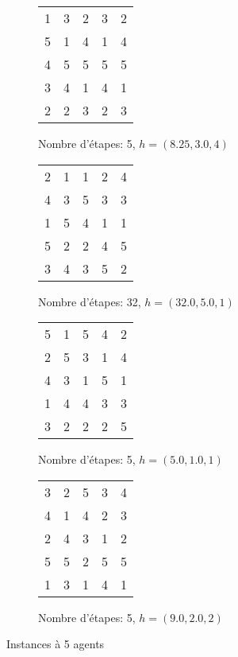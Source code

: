 \documentclass[a4paper, 10pt]{article}
\newcommand{\bb}[1]{\colorbox{blue!30}{#1}}
\begin{document}
\begin{figure}[h]
\centering
\begin{subfigure}[h]{0.45\textwidth}
	\centering
	\begin{tabular}{|c c c c c|}
		\hline
		\bb{1} & \bb{3} & \bb{2} & 3 & 2 \\
		5 & 1 & 4 & 1 & \bb{4} \\
		4 & 5 & 5 & \bb{5} & 5 \\
		3 & 4 & 1 & 4 & 1 \\
		2 & 2 & 3 & 2 & 3 \\
		\hline
	\end{tabular}
	\caption{Nombre d'étapes: 5, $h = (8.25, 3.0, 4)$}
\end{subfigure}
\begin{subfigure}[h]{0.45\textwidth}
	\centering
	\begin{tabular}{|c c c c c|}
		\hline
		2 & 1 & 1 & \bb{2} & 4 \\
		\bb{4} & \bb{3} & \bb{5} & 3 & 3 \\
		1 & 5 & 4 & 1 & \bb{1} \\
		5 & 2 & 2 & 4 & 5 \\
		3 & 4 & 3 & 5 & 2 \\
		\hline
	\end{tabular}
	\caption{Nombre d'étapes: 32, $h = (32.0, 5.0, 1)$}
\end{subfigure}
\begin{subfigure}[h]{0.45\textwidth}
	\centering
	\begin{tabular}{|c c c c c|}
		\hline
		\bb{5} & \bb{1} & 5 & \bb{4} & \bb{2} \\
		2 & 5 & \bb{3} & 1 & 4 \\
		4 & 3 & 1 & 5 & 1 \\
		1 & 4 & 4 & 3 & 3 \\
		3 & 2 & 2 & 2 & 5 \\
		\hline
	\end{tabular}
	\caption{Nombre d'étapes: 5, $h = (5.0, 1.0, 1)$}
\end{subfigure}
\begin{subfigure}[h]{0.45\textwidth}
	\centering
	\begin{tabular}{|c c c c c|}
		\hline
		\bb{3} & \bb{2} & \bb{5} & 3 & \bb{4} \\
		4 & 1 & 4 & 2 & 3 \\
		2 & 4 & 3 & \bb{1} & 2 \\
		5 & 5 & 2 & 5 & 5 \\
		1 & 3 & 1 & 4 & 1 \\
		\hline
	\end{tabular}
	\caption{Nombre d'étapes: 5, $h = (9.0, 2.0, 2)$}
\end{subfigure}
\caption{Instances à 5 agents}
\end{figure}
\end{document}
